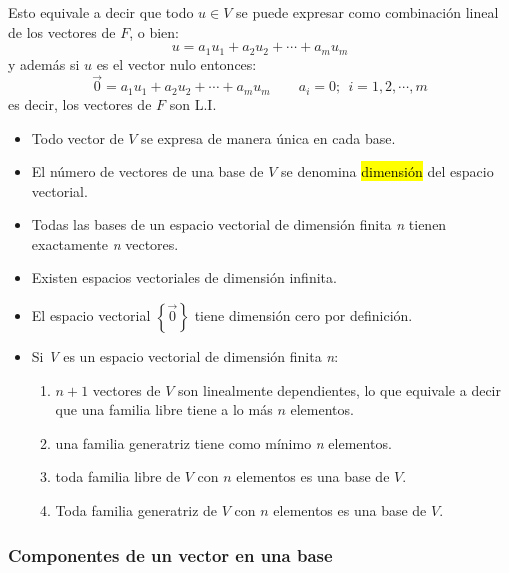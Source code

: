 Esto equivale a decir que todo \(u \in V\) se puede expresar como combinación lineal de los vectores de \(F\), o bien:
\[
  u = a_1 u_1 + a_2 u _2 + \cdots + a_m u_m
\] 
y además si \(u\) es el vector nulo entonces:
\[
  \vec{0} = a_1 u_1 + a_2 u_2 + \cdots + a_m u_m \qquad a_i = 0; ~~ i=1,2,\cdots,m
\]
es decir, los vectores de \(F\) son L.I.

\begin{itemize}
  \item Todo vector de \(V\) se expresa de manera única en cada base.
  \item El número de vectores de una base de \(V\) se denomina \hl{dimensión} del espacio vectorial.
  \item Todas las bases de un espacio vectorial de dimensión finita \textit{n} tienen exactamente \textit{n} vectores.
  \item Existen espacios vectoriales de dimensión infinita.
  \item El espacio vectorial \(\left\{\vec{0}\right\}\) tiene dimensión cero por definición.
  \item Si \textit{V} es un espacio vectorial de dimensión finita \textit{n}:
  \begin{enumerate}
    \item \(n+1\) vectores de \(V\) son linealmente dependientes, lo que equivale a decir que una familia libre tiene a lo más \(n\) elementos.
    \item una familia generatriz tiene como mínimo \textit{n} elementos.
    \item toda familia libre de \(V\) con \(n\) elementos es una base de \(V\).
    \item Toda familia generatriz de \(V\) con \(n\) elementos es una base de \(V\).
  \end{enumerate}
\end{itemize}

\subsubsection{Componentes de un vector en una base}

